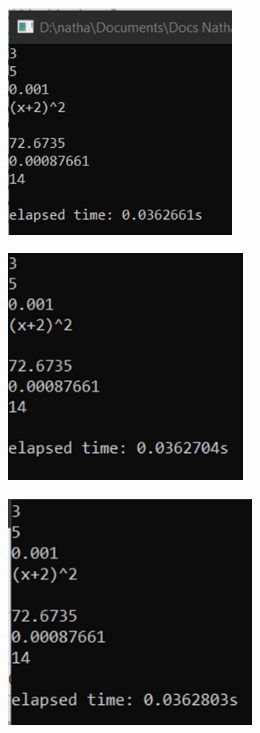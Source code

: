 \documentclass[12pt, letterpaper]{article}
\begin{document}
\begin{flushleft}
    \begin{figure}[H]
        \begin{subfigure}{0.49\textwidth}
            \includegraphics[width=1\linewidth, height=6cm]{Imagen1} 
        \end{subfigure}
        \begin{subfigure}{0.49\textwidth}
            \includegraphics[width=1\linewidth, height=6cm]{Imagen2}
        \end{subfigure}
        \begin{subfigure}{0.49\textwidth}
            \includegraphics[width=1\linewidth, height=6cm]{Imagen3}
        \end{subfigure}
        \begin{subfigure}{0.49\textwidth}

\end{subfigure}
\end{figure}
\end{flushleft}
\end{document}
